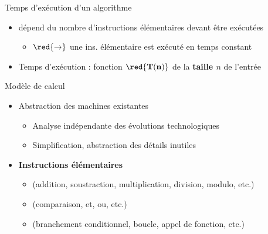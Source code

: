 
\begin{frame}{Temps d'exécution d'un algorithme}
  \begin{itemize}
  \item dépend du nombre d'instructions élémentaires devant être exécutées 
    \begin{itemize}
    \item[]$\red{\rightarrow}$ une ins. élémentaire est exécuté en temps constant 
    \end{itemize}
  \item Temps d'exécution : fonction $\red{\mathbf{T(n)}}$ de la \textbf{taille $n$} de l'entrée 
  \end{itemize}
\end{frame}

\begin{frame}{Modèle de calcul}
  \begin{itemize}
  \item Abstraction des machines existantes
    \begin{itemize}
    \item Analyse indépendante des évolutions technologiques
    \item Simplification, abstraction des détails inutiles
    \end{itemize}
  \item \textbf{Instructions élémentaires}
    \begin{itemize}
    \item {} (addition, soustraction, multiplication, division, modulo, etc.)
    \item {} (comparaison, et, ou, etc.)
    \item {} (branchement conditionnel, boucle, appel de fonction, etc.)
    \end{itemize}
  \end{itemize}
\end{frame}

